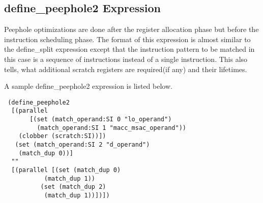\subsection{define\_peephole2 Expression}

Peephole optimizations are done after the register allocation phase but before the instruction scheduling phase. The format of this expression is almost
similar to the define\_split expression except that the instruction pattern to be matched in this case is a sequence of instructions instead of a single
instruction.  This also tells, what additional scratch registers are required(if any) and their lifetimes.

A sample define\_peephole2 expression is listed below.

\begin{example}
\onehalfspacing
\begin{verbatim}
 (define_peephole2
  [(parallel
       [(set (match_operand:SI 0 "lo_operand")
	     (match_operand:SI 1 "macc_msac_operand"))
	(clobber (scratch:SI))])
   (set (match_operand:SI 2 "d_operand")
	(match_dup 0))]
  ""
  [(parallel [(set (match_dup 0)
		   (match_dup 1))
	      (set (match_dup 2)
		   (match_dup 1))])])
\end{verbatim}
 
\end{example}




   
